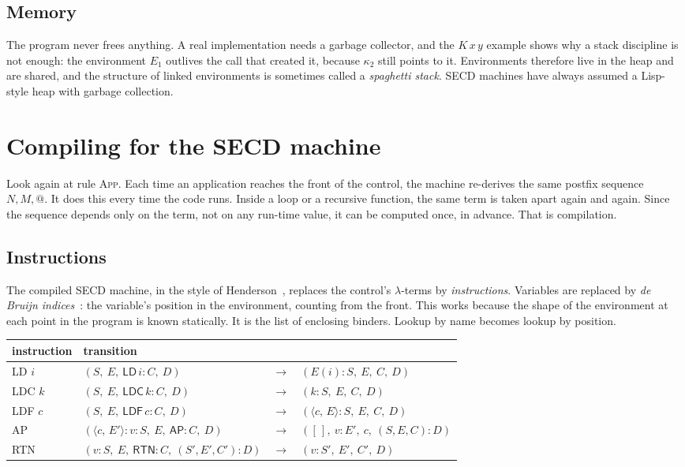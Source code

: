 \documentclass[11pt,a4paper]{article}
\makeatletter
\newcommand{\ap}{\mathtt{@}}
\newcommand{\cl}[2]{\langle #1,\, #2\rangle}
\newcommand{\emp}{[\,]}
\newcommand{\rul}[1]{\textsc{#1}}
\newcommand{\ins}[1]{\textsf{#1}}
\newcommand{\st}[4]{(#1,\ #2,\ #3,\ #4)}
\theoremstyle{definition}
\theoremstyle{plain}
\makeatother
\begin{document}
\subsection{Memory}

The program never frees anything. A real implementation needs a garbage
collector, and the $K\,x\,y$ example shows why a stack discipline is not
enough: the environment $E_1$ outlives the call that created it, because
$\kappa_2$ still points to it. Environments therefore live in the heap and
are shared, and the structure of linked environments is sometimes called a
\emph{spaghetti stack}. SECD machines have always assumed a Lisp-style heap
with garbage collection.

\section{Compiling for the SECD machine}\label{sec:compiling}

Look again at rule \rul{App}. Each time an application reaches the front of
the control, the machine re-derives the same postfix sequence $N, M, \ap$. It
does this every time the code runs. Inside a loop or a recursive function,
the same term is taken apart again and again. Since the sequence depends
only on the term, not on any run-time value, it can be computed once, in
advance. That is compilation.

\subsection{Instructions}

The compiled SECD machine, in the style of Henderson~\cite{henderson80},
replaces the control's $\lambda$-terms by \emph{instructions}. Variables
are replaced by \emph{de Bruijn indices}~\cite{debruijn72}: the variable's
position in the environment, counting from the front. This works because the
shape of the environment at each point in the program is known statically.
It is the list of enclosing binders. Lookup by name becomes lookup by
position.

\begin{center}
\small
\begin{tabular}{@{}l l@{\;}c@{\;}l@{}}
\toprule
instruction & \multicolumn{3}{l}{transition}\\
\midrule
\ins{LD} $i$ & $\st{S}{E}{\ins{LD}\,i : C}{D}$ &$\to$& $\st{E(i) : S}{E}{C}{D}$\\
\ins{LDC} $k$ & $\st{S}{E}{\ins{LDC}\,k : C}{D}$ &$\to$& $\st{k : S}{E}{C}{D}$\\
\ins{LDF} $c$ & $\st{S}{E}{\ins{LDF}\,c : C}{D}$ &$\to$& $\st{\cl{c}{E} : S}{E}{C}{D}$\\
\ins{AP} & $\st{\cl{c}{E'} : v : S}{E}{\ins{AP} : C}{D}$ &$\to$& $\st{\emp}{v : E'}{c}{(S,E,C) : D}$\\
\ins{RTN} & $\st{v : S}{E}{\ins{RTN} : C}{(S',E',C') : D}$ &$\to$& $\st{v : S'}{E'}{C'}{D}$\\
\bottomrule
\end{tabular}
\end{center}
\end{document}
